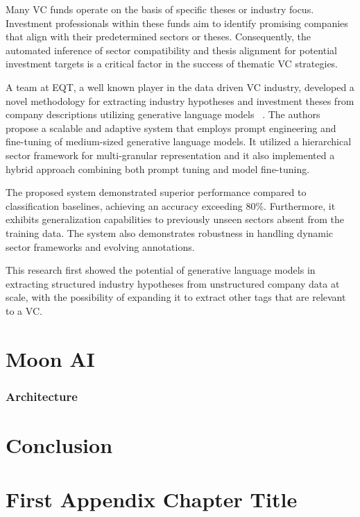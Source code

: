 \documentclass[a4paper, oneside]{discothesis}
\begin{document}
Many VC funds operate on the basis of specific theses or industry focus. Investment professionals within these funds aim to identify promising companies that align with their predetermined sectors or theses. Consequently, the automated inference of sector compatibility and thesis alignment for potential investment targets is a critical factor in the success of thematic VC strategies.


A team at EQT, a well known player in the data driven VC industry, developed a novel methodology for extracting industry hypotheses and investment theses from company descriptions utilizing generative language models ~\cite{lele_cao_infer_industry_sector}. The authors propose a scalable and adaptive system that employs prompt engineering and fine-tuning of medium-sized generative language models. It utilized a hierarchical sector framework for multi-granular representation and it also implemented a hybrid approach combining both prompt tuning and model fine-tuning.

The proposed system demonstrated superior performance compared to classification baselines, achieving an accuracy exceeding 80\%. Furthermore, it exhibits generalization capabilities to previously unseen sectors absent from the training data. The system also demonstrates robustness in handling dynamic sector frameworks and evolving annotations.

This research first showed the potential of generative language models in extracting structured industry hypotheses from unstructured company data at scale, with the possibility of expanding it to extract other tags that are relevant to a VC. 

\chapter{Moon AI}
\subsection{Architecture}

\chapter{Conclusion}





\appendix
\chapter{First Appendix Chapter Title}
\end{document}
